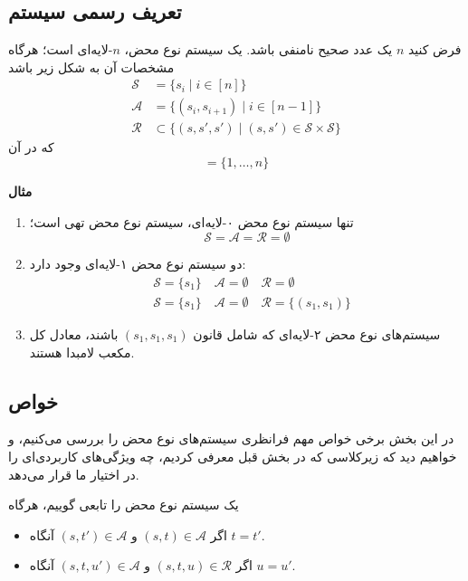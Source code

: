 \subsection*{تعریف رسمی سیستم}

\begin{defn}
فرض کنید
$n$
یک عدد صحیح نامنفی باشد. یک سیستم نوع محض،
$n$-لایه‌ای
است؛ هرگاه مشخصات آن به شکل زیر باشد
\begin{align*}
\mathcal{S} &= \{ s_i \mid i \in [n] \}\\
\mathcal{A} &= \{ (s_i,s_{i+1}) \mid i \in [n-1] \}\\
\mathcal{R} &\subset \{ (s,s',s') \mid (s,s') \in \mathcal{S} \times \mathcal{S} \}
\end{align*}
که در آن
\begin{equation*}
[n] = \{1,\dots,n\}
\end{equation*}
\end{defn}

\textbf{مثال}
\begin{enumerate}
\item تنها سیستم نوع محض ۰-لایه‌ای، سیستم نوع محض تهی است؛
\begin{equation*}
\mathcal{S}=\mathcal{A}=\mathcal{R}=\emptyset    
\end{equation*}
\item دو سیستم نوع محض ۱-لایه‌ای وجود دارد:
\begin{align*}
&\mathcal{S}=\{s_1\} \quad \mathcal{A}=\emptyset \quad \mathcal{R}=\emptyset\\
&\mathcal{S}=\{s_1\} \quad \mathcal{A}=\emptyset \quad \mathcal{R}=\{(s_1,s_1)\}
\end{align*}
\item سیستم‌های نوع محض ۲-لایه‌ای که شامل قانون $(s_1,s_1,s_1)$ باشند، معادل کل مکعب لامبدا هستند.
\end{enumerate}

\subsection*{خواص}

در این بخش برخی خواص مهم فرانظری سیستم‌های نوع محض را بررسی می‌کنیم، و خواهیم دید که زیرکلاسی که در بخش قبل معرفی کردیم، چه ویژگی‌های کاربردی‌ای را در اختیار ما قرار می‌دهد.

\begin{defn}
یک سیستم نوع محض  را تابعی گوییم، هرگاه
\begin{itemize}
\item اگر $(s,t) \in \mathcal{A}$ و $(s,t') \in \mathcal{A}$ آنگاه $t=t'$.
\item اگر $(s,t,u) \in \mathcal{R}$ و $(s,t,u') \in \mathcal{A}$ آنگاه $u=u'$.
\end{itemize}
\end{defn}

